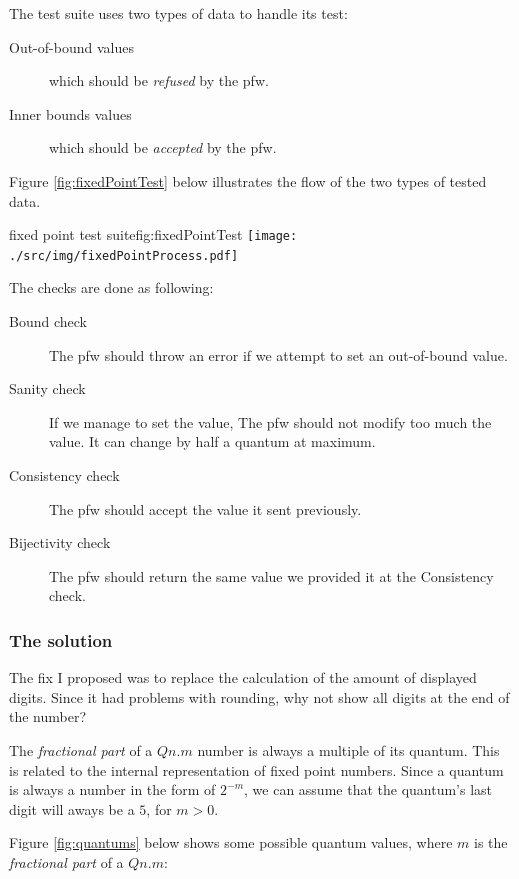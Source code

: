 The test suite uses two types of data to handle its test:
\begin{description}
    \item[Out-of-bound values] which should be \emph{refused} by the \gls{pfw}.
    \item[Inner bounds values] which should be \emph{accepted} by the \gls{pfw}.
\end{description}

Figure \ref{fig:fixedPointTest} below illustrates the flow of the two types of tested data.

\begin{figureGraphics}{fixed point test suite}{fig:fixedPointTest}
    \texttt{[image: ./src/img/fixedPointProcess.pdf]}
\end{figureGraphics}

The checks are done as following:
\begin{description}
    \item[Bound check] The \gls{pfw} should throw an error if we
        attempt to set an out-of-bound value.
    \item[Sanity check] If we manage to set the value, The \gls{pfw} should not modify too much
        the value. It can change by half a quantum at maximum.
    \item[Consistency check] The \gls{pfw} should accept the value it sent previously.
    \item[Bijectivity check] The \gls{pfw} should return the same value we provided it at the Consistency check.
\end{description}

\subsubsection{The solution}
The fix I proposed was to replace the calculation of the amount of displayed digits.
Since it had problems with rounding, why not show all digits at the end of the number?

The \emph{fractional part} of a $Qn.m$ number is always a multiple of its quantum. This is related to
the internal representation of fixed point numbers. Since a quantum is always a number in the form of $2^{-m}$, we can
assume that the quantum's last digit will aways be a $5$, for $m > 0$.

Figure \ref{fig:quantums} below shows some possible quantum values, where $m$ is the \emph{fractional part} of a $Qn.m$:

